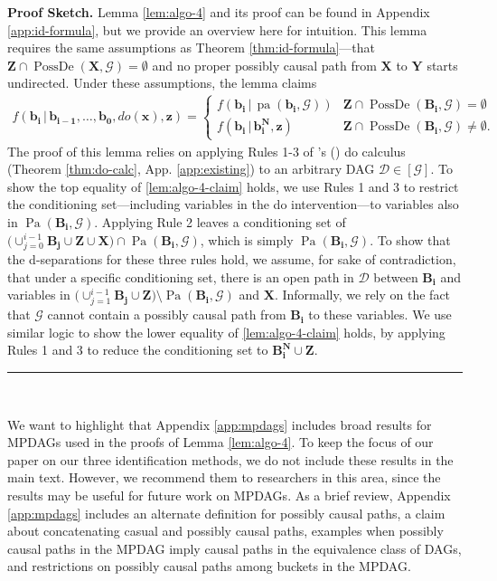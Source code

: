 \documentclass[11pt]{article}
\DeclareMathOperator{\Pa}{Pa}
\DeclareMathOperator{\pa}{pa}
\DeclareMathOperator{\PossDe}{PossDe}
\newcommand{\BlackBox}{\rule{1.5ex}{1.5ex}}  %
\newcommand{\mb}[1]{\mathbf{#1}}
\newcommand{\g}[1][G]{\mathcal{#1}}
\newenvironment{proofsketch}{\noindent \textbf{Proof Sketch.}}{\hfill\BlackBox\\}
\begin{document}
\begin{proofsketch}
    Lemma \ref{lem:algo-4} and its proof can be found in Appendix \ref{app:id-formula}, but we provide an overview here for intuition. This lemma requires the same assumptions as Theorem \ref{thm:id-formula}---that $\mb{Z} \cap \PossDe(\mb{X},\g) = \emptyset$ and no proper possibly causal path from $\mb{X}$ to $\mb{Y}$ starts undirected. Under these assumptions, the lemma claims
    \begin{align}
        f(\mb{b_i} \,|\, \mb{b_{i-1}}, \dots, \mb{b_0}, do(\mb{x}),\mb{z}) = 
        \begin{cases} 
            f(\mb{b_i} \,|\, \pa(\mb{b_i},\g)) & \mb{Z} \cap \PossDe(\mb{B_i}, \g) = \emptyset\\
            f(\mb{b_i} \,|\, \mb{b_i^N}, \mb{z}) & \mb{Z} \cap \PossDe(\mb{B_i}, \g) \neq \emptyset.
        \end{cases} \label{lem:algo-4-claim}
    \end{align}
    The proof of this lemma relies on applying Rules 1-3 of \citeauthor{pearl2009causality}'s (\citeyear{pearl2009causality}) do calculus (Theorem \ref{thm:do-calc}, App. \ref{app:existing}) to an arbitrary DAG $\g[D] \in [\g]$. To show the top equality of \eqref{lem:algo-4-claim} holds, we use Rules 1 and 3 to restrict the conditioning set---including variables in the do intervention---to variables also in $\Pa(\mb{B_i},\g)$. Applying Rule 2 leaves a conditioning set of $\big(\cup_{j=0}^{i-1} \mb{B_j} \cup \mb{Z} \cup \mb{X} \big) \cap \Pa(\mb{B_i}, \g)$, which is simply $\Pa(\mb{B_i},\g)$. To show that the d-separations for these three rules hold, we assume, for sake of contradiction, that under a specific conditioning set, there is an open path in $\g[D]$ between $\mb{B_i}$ and variables in $\big(\cup_{j=1}^{i-1} \mb{B_j} \cup \mb{Z} \big) \setminus \Pa(\mb{B_i}, \g)$ and $\mb{X}$. Informally, we rely on the fact that $\g$ cannot contain a possibly causal path from $\mb{B_i}$ to these variables. We use similar logic to show the lower equality of \eqref{lem:algo-4-claim} holds, by applying Rules 1 and 3 to reduce the conditioning set to $\mb{B_i^N} \cup \mb{Z}$.
\end{proofsketch}

We want to highlight that Appendix \ref{app:mpdags} includes broad results for MPDAGs used in the proofs of Lemma \ref{lem:algo-4}. To keep the focus of our paper on our three identification methods, we do not include these results in the main text. However, we recommend them to researchers in this area, since the results may be useful for future work on MPDAGs. As a brief review, Appendix \ref{app:mpdags} includes an alternate definition for possibly causal paths, a claim about concatenating casual and possibly causal paths, examples when possibly causal paths in the MPDAG imply causal paths in the equivalence class of DAGs, and restrictions on possibly causal paths among buckets in the MPDAG.
\end{document}

